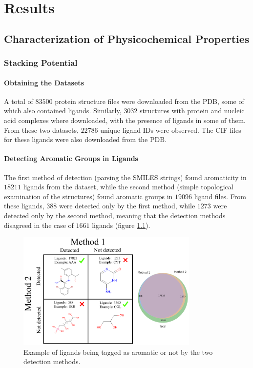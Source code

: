\chapter{Results} %

\section{Characterization of Physicochemical Properties}
  \subsection{Stacking Potential}
    \subsubsection{Obtaining the Datasets}
      A total of $83500$ protein structure files were downloaded from the PDB, some of which also contained ligands. Similarly, $3032$ structures with protein and nucleic acid complexes where downloaded, with the presence of ligands in some of them. From these two datasets, $22786$ unique ligand IDs were observed. The CIF files for these ligands were also downloaded from the PDB.

    \subsubsection{Detecting Aromatic Groups in Ligands}
      The first method of detection (parsing the SMILES strings) found aromaticity in $18211$ ligands from the dataset, while the second method (simple topological examination of the structures) found aromatic groups in $19096$ ligand files. From these ligands, $388$ were detected only by the first method, while $1273$ were detected only by the second method, meaning that the detection methods disagreed in the case of $1661$ ligands (figure \ref{fig:results/stacking_detection}).

      \begin{figure}[H]
        \centering
        \includegraphics[width=0.8\textwidth]{figures/results/stacking_detection.png}
        \caption{\label{fig:results/stacking_detection} Example of ligands being tagged as aromatic or not by the two detection methods.}
      \end{figure}

